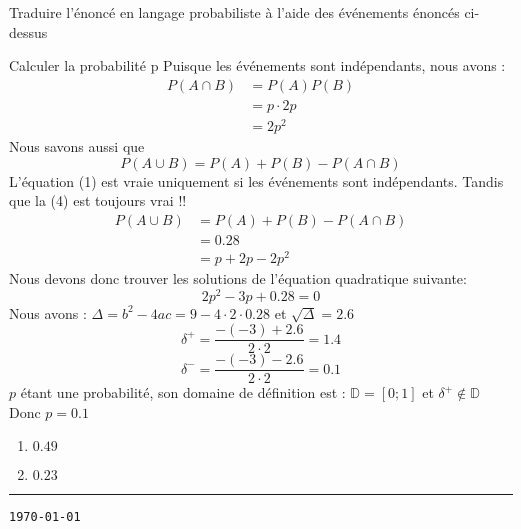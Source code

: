 \begin{exo}
\begin{subexo}{Traduire l'énoncé en langage probabiliste à l'aide des événements énoncés ci-dessus}
		\end{subexo}
		\begin{subexo}{Calculer la probabilité p}
			Puisque les événements sont indépendants, nous avons : 
					\begin{align}
						P(A \cap B) &= P(A) P(B)\\
				&= p \cdot 2p\\
				&= 2p^2
					\end{align}
				Nous savons aussi que
					\begin{equation}
						P(A \cup B) = P(A) + P(B) -P(A \cap B)
					\end{equation}
					L'équation (1) est vraie uniquement si les événements sont indépendants. Tandis que la (4) est toujours vrai !! 
					\begin{align}
						P(A \cup B) &= P(A) + P(B) -P(A \cap B)\\
						 &= 0.28\\
						 &= p + 2p - 2p^2
					\end{align}
					Nous devons donc trouver les solutions de l'équation quadratique suivante:
					$$2p^2 - 3p + 0.28 = 0$$
						Nous avons : $\Delta = b^2 -4ac = 9 -4\cdot 2\cdot 0.28$\newline
						 et $\sqrt{\Delta} = 2.6$
						 $$\delta^+ = \frac{-(-3) + 2.6}{2\cdot2} = 1.4$$
						 $$\delta^- = \frac{-(-3) - 2.6}{2\cdot2} = 0.1$$
						$p$ étant une probabilité, son domaine de définition est : $\mathbb{D} = [0;1]$ et $\delta^+ \notin \mathbb{D}$ 
						Donc $p = 0.1$
		\end{subexo}
	\end{exo}
	
	\begin{exo}
		\begin{enumerate}[label=\alph*), parsep=0cm, itemsep=3mm, topsep=5mm]
			\item $0.49$
			\item $0.23$
		\end{enumerate}
	\end{exo}
	
	\vfill
	\hrule
	\vspace{2mm}
	 \hfill {\tt \tiny \today}

